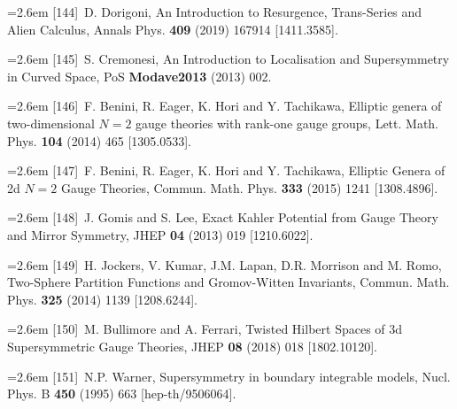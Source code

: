 \par\noindent\hangindent=2.6em [144]~D. Dorigoni, An Introduction to Resurgence, Trans-Series and Alien Calculus, Annals Phys. \textbf{409} (2019) 167914 [1411.3585].

\par\noindent\hangindent=2.6em [145]~S. Cremonesi, An Introduction to Localisation and Supersymmetry in Curved Space, PoS \textbf{Modave2013} (2013) 002.

\par\noindent\hangindent=2.6em [146]~F. Benini, R. Eager, K. Hori and Y. Tachikawa, Elliptic genera of two-dimensional $N=2$ gauge theories with rank-one gauge groups, Lett. Math. Phys. \textbf{104} (2014) 465 [1305.0533].

\par\noindent\hangindent=2.6em [147]~F. Benini, R. Eager, K. Hori and Y. Tachikawa, Elliptic Genera of 2d $N=2$ Gauge Theories, Commun. Math. Phys. \textbf{333} (2015) 1241 [1308.4896].

\par\noindent\hangindent=2.6em [148]~J. Gomis and S. Lee, Exact Kahler Potential from Gauge Theory and Mirror Symmetry, JHEP \textbf{04} (2013) 019 [1210.6022].

\par\noindent\hangindent=2.6em [149]~H. Jockers, V. Kumar, J.M. Lapan, D.R. Morrison and M. Romo, Two-Sphere Partition Functions and Gromov-Witten Invariants, Commun. Math. Phys. \textbf{325} (2014) 1139 [1208.6244].

\par\noindent\hangindent=2.6em [150]~M. Bullimore and A. Ferrari, Twisted Hilbert Spaces of 3d Supersymmetric Gauge Theories, JHEP \textbf{08} (2018) 018 [1802.10120].

\par\noindent\hangindent=2.6em [151]~N.P. Warner, Supersymmetry in boundary integrable models, Nucl. Phys. B \textbf{450} (1995) 663 [hep-th/9506064].
